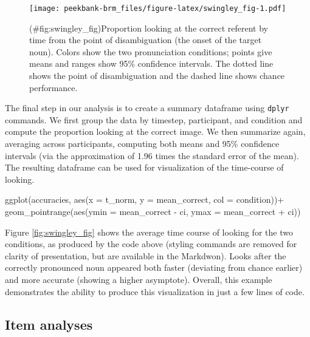 \documentclass[
  english,
  man,floatsintext]{apa6}
\newenvironment{Shaded}{\begin{snugshade}}{\end{snugshade}}
\newcommand{\AttributeTok}[1]{\textcolor[rgb]{0.77,0.63,0.00}{#1}}
\newcommand{\FunctionTok}[1]{\textcolor[rgb]{0.00,0.00,0.00}{#1}}
\newcommand{\NormalTok}[1]{#1}
\newcommand{\SpecialCharTok}[1]{\textcolor[rgb]{0.00,0.00,0.00}{#1}}
\begin{document}
\begin{figure}
\centering
\texttt{[image: peekbank-brm\_files/figure-latex/swingley\_fig-1.pdf]}
\caption{(\#fig:swingley\_fig)Proportion looking at the correct referent by time from the point of disambiguation (the onset of the target noun). Colors show the two pronunciation conditions; points give means and ranges show 95\% confidence intervals. The dotted line shows the point of disambiguation and the dashed line shows chance performance.}
\end{figure}

The final step in our analysis is to create a summary dataframe using \texttt{dplyr} commands. We first group the data by timestep, participant, and condition and compute the proportion looking at the correct image. We then summarize again, averaging across participants, computing both means and 95\% confidence intervals (via the approximation of 1.96 times the standard error of the mean). The resulting dataframe can be used for visualization of the time-course of looking.

\begin{Shaded}
\begin{Highlighting}[]
\FunctionTok{ggplot}\NormalTok{(accuracies, }\FunctionTok{aes}\NormalTok{(}\AttributeTok{x =}\NormalTok{ t\_norm, }\AttributeTok{y =}\NormalTok{ mean\_correct, }\AttributeTok{col =}\NormalTok{ condition))}\SpecialCharTok{+}
  \FunctionTok{geom\_pointrange}\NormalTok{(}\FunctionTok{aes}\NormalTok{(}\AttributeTok{ymin =}\NormalTok{ mean\_correct }\SpecialCharTok{{-}}\NormalTok{ ci, }
                      \AttributeTok{ymax =}\NormalTok{ mean\_correct }\SpecialCharTok{+}\NormalTok{ ci))}
\end{Highlighting}
\end{Shaded}

Figure \ref{fig:swingley_fig} shows the average time course of looking for the two conditions, as produced by the code above (styling commands are removed for clarity of presentation, but are available in the Markdwon). Looks after the correctly pronounced noun appeared both faster (deviating from chance earlier) and more accurate (showing a higher asymptote). Overall, this example demonstrates the ability to produce this visualization in just a few lines of code.

\hypertarget{item-analyses}{%
\subsection{Item analyses}\label{item-analyses}}
\end{document}
